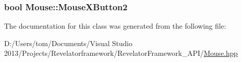 \hypertarget{class_mouse_ade6dd013286bf4829948f8a69d9b7f8a}{
\subsubsection[{Mouse\-X\-Button2}]{\setlength{\rightskip}{0pt plus 5cm}bool Mouse\-::\-Mouse\-X\-Button2\hspace{0.3cm}{\ttfamily [private]}}}\label{class_mouse_ade6dd013286bf4829948f8a69d9b7f8a}


The documentation for this class was generated from the following file\-:\begin{DoxyCompactItemize}
\item 
D\-:/\-Users/tom/\-Documents/\-Visual Studio 2013/\-Projects/\-Revelatorframework/\-Revelator\-Framework\-\_\-\-A\-P\-I/\hyperlink{_mouse_8hpp}{Mouse.\-hpp}\end{DoxyCompactItemize}
